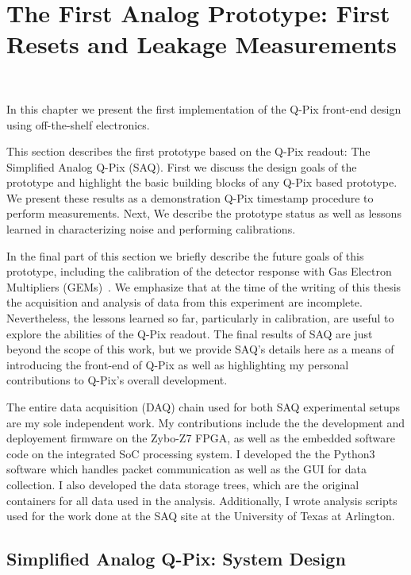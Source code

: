 \chapter{The First Analog Prototype: First Resets and Leakage Measurements}~\label{chap:saq}

In this chapter we present the first implementation of the Q-Pix front-end design using off-the-shelf electronics.

This section describes the first prototype based on the Q-Pix readout: The Simplified Analog Q-Pix (SAQ).
First we discuss the design goals of the prototype and highlight the basic building blocks of any Q-Pix based prototype.
We present these results as a demonstration Q-Pix timestamp procedure to perform measurements.
Next, We describe the prototype status as well as lessons learned in characterizing noise and performing calibrations.

In the final part of this section we briefly describe the future goals of this prototype, including the calibration of the detector response with Gas Electron Multipliers (GEMs)~\citep{SAULI20162}.
We emphasize that at the time of the writing of this thesis the acquisition and analysis of data from this experiment are incomplete.
Nevertheless, the lessons learned so far, particularly in calibration, are useful to explore the abilities of the Q-Pix readout.
The final results of SAQ are just beyond the scope of this work, but we provide SAQ's details here as a means of introducing the front-end of Q-Pix as well as highlighting my personal contributions to Q-Pix's overall development.

The entire data acquisition (DAQ) chain used for both SAQ experimental setups are my sole independent work.
My contributions include the the development and deployement firmware on the Zybo-Z7 FPGA, as well as the embedded software code on the integrated SoC processing system.
I developed the the Python3 software which handles packet communication as well as the GUI for data collection.
I also developed the data storage trees, which are the original containers for all data used in the analysis. 
Additionally, I wrote analysis scripts used for the work done at the SAQ site at the University of Texas at Arlington.

\section{Simplified Analog Q-Pix: System Design}

